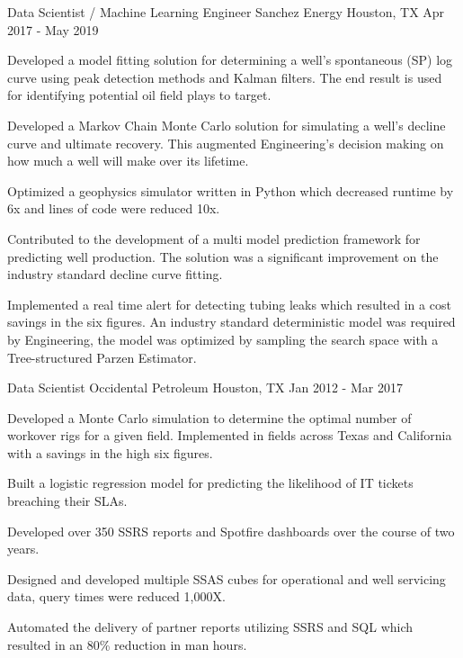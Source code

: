 \begin{cventries}
\cventry
{Data Scientist / Machine Learning Engineer} %
{Sanchez Energy} %
{Houston, TX} %
{Apr 2017 - May 2019} %
{ %
\begin{cvitems}
\item {Developed a model fitting solution for determining a well's spontaneous (SP) log curve using peak detection methods and Kalman filters. The end result is used for identifying potential oil field plays to target.}
\item {Developed a Markov Chain Monte Carlo solution for simulating a well's decline curve and ultimate recovery. This augmented Engineering's decision making on how much a well will make over its lifetime.}
\item {Optimized a geophysics simulator written in Python which decreased runtime by 6x and lines of code were reduced 10x.}
\item {Contributed to the development of a multi model prediction framework for predicting well production. The solution was a significant improvement on the industry standard decline curve fitting.}
\item {Implemented a real time alert for detecting tubing leaks which resulted in a cost savings in the six figures. An industry standard deterministic model was required by Engineering, the model was optimized by sampling the search space with a Tree-structured Parzen Estimator.}
\end{cvitems}
}


\cventry
{Data Scientist} %
{Occidental Petroleum} %
{Houston, TX} %
{Jan 2012 - Mar 2017} %
{ %
\begin{cvitems}
\item {Developed a Monte Carlo simulation to determine the optimal number of workover rigs for a given field. Implemented in fields across Texas and California with a savings in the high six figures.}
\item {Built a logistic regression model for predicting the likelihood of IT tickets breaching their SLAs.}
\end{cvitems}
}

{
\begin{cvitems}
\item {Developed over 350 SSRS reports and Spotfire dashboards over the course of two years.}
\item {Designed and developed multiple SSAS cubes for operational and well servicing data, query times were reduced 1,000X.}
\item {Automated the delivery of partner reports utilizing SSRS and SQL which resulted in an 80\% reduction in man hours.}
\end{cvitems}
}

\end{cventries}